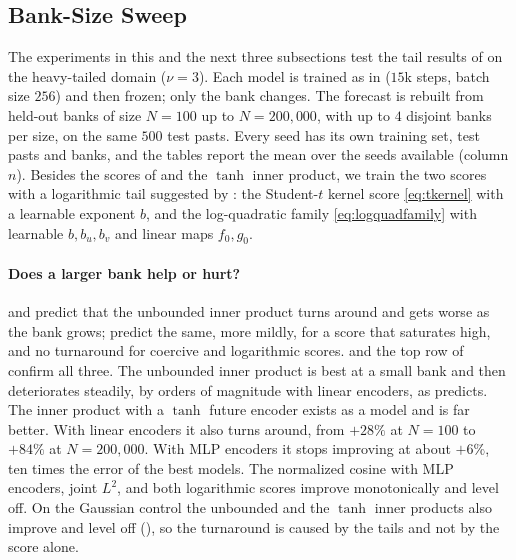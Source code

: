 \documentclass[11pt]{article}
\theoremstyle{plain}
\theoremstyle{definition}
\theoremstyle{remark}
\begin{document}
\subsection{Bank-Size Sweep}
\label{ssec:banksweep}

The experiments in this and the next three subsections test the tail results
of  on the heavy-tailed domain ($\nu=3$). Each model is
trained as in  ($15$k steps, batch size $256$) and then
frozen; only the bank changes. The forecast is rebuilt from held-out banks of
size $N=100$ up to $N=200{,}000$, with up to $4$ disjoint banks per size, on
the same $500$ test pasts. Every seed has its own training set, test pasts
and banks, and the tables report the mean over the seeds available (column
$n$). Besides the scores of  and the $\tanh$ inner product,
we train the two scores with a logarithmic tail suggested by
: the Student-$t$ kernel score \eqref{eq:tkernel} with a
learnable exponent $b$, and the log-quadratic family
\eqref{eq:logquadfamily} with learnable $b,b_u,b_v$ and linear maps $f_0,g_0$.

\paragraph{Does a larger bank help or hurt?}
 and  predict that the unbounded inner
product turns around and gets worse as the bank grows;
 predict the same, more mildly, for a score
that saturates high, and no turnaround for coercive and logarithmic scores.
 and the top row of  confirm all three.
The unbounded inner product is best at a small bank and then deteriorates
steadily, by orders of magnitude with linear encoders, as
 predicts. The inner product with a $\tanh$ future
encoder exists as a model and is far better. With linear encoders it also
turns around, from $+28\%$ at $N=100$ to $+84\%$ at $N=200{,}000$. With MLP
encoders it stops improving at about $+6\%$, ten times the error of the best
models. The
normalized cosine with MLP encoders, joint $L^2$, and both logarithmic scores
improve monotonically and level off. On the Gaussian control the unbounded
and the $\tanh$ inner products also improve and level off
(), so the turnaround is caused by the tails and
not by the score alone.
\end{document}
